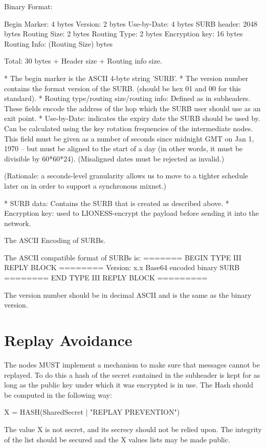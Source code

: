 Binary Format:

   Begin Marker: 4 bytes
   Version:      2 bytes
   Use-by-Date:  4 bytes
   SURB header:  2048 bytes
   Routing Size: 2 bytes
   Routing Type: 2 bytes
   Encryption key: 16 bytes
   Routing Info: (Routing Size) bytes

   Total: 30 bytes + Header size + Routing info size.

* The begin marker is the ASCII 4-byte string 'SURB'. 
* The version number contains the format version of the SURB.
  (should be hex 01 and 00 for this standard).
* Routing type/routing size/routing info: Defined as in subheaders.
  These fields encode the address of the hop which the SURB user should
  use as an exit point.
* Use-by-Date: indicates the expiry date the SURB should be used by. Can
  be calculated using the key rotation frequencies of the intermediate
  nodes.  This field must be given as a number of seconds since
  midnight GMT on Jan 1, 1970 -- but must be aligned to the start of a
  day (in other words, it must be divisible by 60*60*24).
  (Misaligned dates must be rejected as invalid.)

  (Rationale: a seconds-level granularity allows us to move to a
  tighter schedule later on in order to support a synchronous mixnet.)

* SURB data: Contains the SURB that is created as described above.
* Encryption key: used to LIONESS-encrypt the payload before sending it
  into the network.  

The ASCII Encoding of SURBs.

The  ASCII compatible format of SURBs is:
======= BEGIN TYPE III REPLY BLOCK ========
Version: x.x
Base64 encoded binary SURB 
======== END TYPE III REPLY BLOCK =========

The version number should be in decimal ASCII and is the same as the
binary version.

\section{Replay Avoidance}

The nodes MUST implement a mechanism to make sure that messages cannot
be replayed. To do this a hash of the secret contained in the
subheader is kept for as long as the public key under which it was
encrypted is in use. The Hash should be computed in the following way:

X = HASH(SharedSecret | "REPLAY PREVENTION")

The value X is not secret, and its secrecy should not be relied upon.
The integrity of the list should be secured and the X values lists may
be made public.

